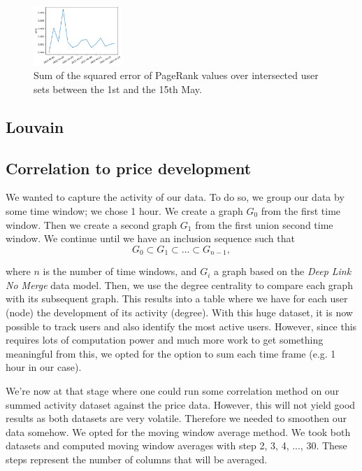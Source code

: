 \begin{figure}[hb!]
    \centering
    \includegraphics[width=0.3\textwidth]{figures/error_days.pdf}
    \caption{Sum of the squared error of PageRank values over intersected user sets between the 1st and the 15th May.}
    \label{fig:errordays}
\end{figure}


\subsection{Louvain}


\subsection{Correlation to price development}

We wanted to capture the activity of our data. To do so, we group our data by some time window; we chose 1 hour. We create a graph $G_0$ from the first time window. Then we create a second graph $G_1$ from the first union second time window. We continue until we have an inclusion sequence such that 
$$ G_0 \subset G_1 \subset  ... \subset G_{n-1},$$

where $n$ is the number of time windows, and $G_i$ a graph based on the \textit{Deep Link No Merge} data model.
Then, we use the degree centrality to compare each graph with its subsequent graph. This results into a table where we have for each user (node) the development of its activity (degree). With this huge dataset, it is now possible to track users and also identify the most active users. However, since this requires lots of computation power and much more work to get something meaningful from this, we opted for the option to sum each time frame (e.g. 1 hour in our case). 

We're now at that stage where one could run some correlation method on our summed activity dataset against the price data. However, this will not yield good results as both datasets are very volatile. Therefore we needed to smoothen our data somehow. We opted for the moving window average method. We took both datasets and computed moving window averages with step 2, 3, 4, ..., 30. These steps represent the number of columns that will be averaged. 


